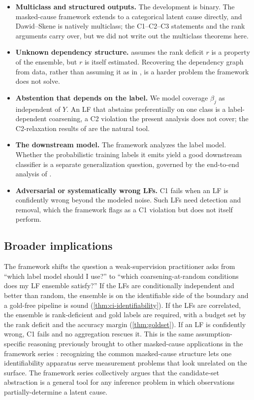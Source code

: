 \begin{itemize}
\item \textbf{Multiclass and structured outputs.} The development is
  binary. The masked-cause framework extends to a categorical latent
  cause directly, and Dawid--Skene is natively multiclass; the
  C1--C2--C3 statements and the rank arguments carry over, but we did
  not write out the multiclass theorems here.

\item \textbf{Unknown dependency structure.} 
  assumes the rank deficit $r$ is a property of the ensemble, but
  $r$ is itself estimated. Recovering the dependency graph from data,
  rather than assuming it as in \citet{ratner2019training}, is a
  harder problem the framework does not solve.

\item \textbf{Abstention that depends on the label.} We model
  coverage $\beta_j$ as independent of $Y$. An LF that abstains
  preferentially on one class is a label-dependent coarsening, a C2
  violation the present analysis does not cover; the C2-relaxation
  results of \citet{towell2026mdrelax} are the natural tool.

\item \textbf{The downstream model.} The framework analyzes the label
  model. Whether the probabilistic training labels it emits yield a
  good downstream classifier is a separate generalization question,
  governed by the end-to-end analysis of \citet{ratner2016data}.

\item \textbf{Adversarial or systematically wrong LFs.} C1 fails when
  an LF is confidently wrong beyond the modeled noise. Such LFs need
  detection and removal, which the framework flags as a C1 violation
  but does not itself perform.
\end{itemize}

\subsection{Broader implications}

The framework shifts the question a weak-supervision practitioner
asks from ``which label model should I use?'' to ``which
coarsening-at-random conditions does my LF ensemble satisfy?'' If the
LFs are conditionally independent and better than random, the
ensemble is on the identifiable side of the boundary and a gold-free
pipeline is sound (\cref{thm:ci-identifiability}). If the LFs are
correlated, the ensemble is rank-deficient and gold labels are
required, with a budget set by the rank deficit and the accuracy
margin (\cref{thm:goldset}). If an LF is confidently wrong, C1 fails
and no aggregation rescues it. This is the same assumption-specific
reasoning previously brought to other masked-cause applications in
the framework series \citep{towell2026masked}: recognizing the
common masked-cause structure lets one identifiability apparatus
serve measurement problems that look unrelated on the surface. The
framework series collectively argues that the candidate-set
abstraction is a general tool for any inference problem in which
observations partially-determine a latent cause.
